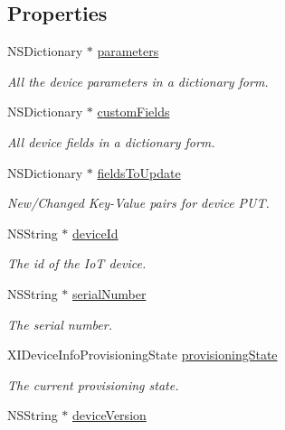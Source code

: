 \subsection*{Properties}
\begin{DoxyCompactItemize}
\item 
N\+S\+Dictionary $\ast$ \hyperlink{class_x_i_device_info_a9ffa8d12d59d023b4e84972d2ab5090b}{parameters}
\begin{DoxyCompactList}\small\item\em All the device parameters in a dictionary form. \end{DoxyCompactList}\item 
N\+S\+Dictionary $\ast$ \hyperlink{class_x_i_device_info_a7f957997e697f1766cd29a57cda05f37}{custom\+Fields}
\begin{DoxyCompactList}\small\item\em All device fields in a dictionary form. \end{DoxyCompactList}\item 
N\+S\+Dictionary $\ast$ \hyperlink{class_x_i_device_info_aaa3e21f185171a65e7976c05209ff3cd}{fields\+To\+Update}
\begin{DoxyCompactList}\small\item\em New/\+Changed Key-\/\+Value pairs for device P\+UT. \end{DoxyCompactList}\item 
N\+S\+String $\ast$ \hyperlink{class_x_i_device_info_aa89ded62978ed5dee588d15b388fd455}{device\+Id}
\begin{DoxyCompactList}\small\item\em The id of the IoT device. \end{DoxyCompactList}\item 
N\+S\+String $\ast$ \hyperlink{class_x_i_device_info_a74d409685fc6546a9272636806985147}{serial\+Number}
\begin{DoxyCompactList}\small\item\em The serial number. \end{DoxyCompactList}\item 
X\+I\+Device\+Info\+Provisioning\+State \hyperlink{class_x_i_device_info_a7ef1e9cac2ea7949086b790b252ce4f2}{provisioning\+State}
\begin{DoxyCompactList}\small\item\em The current provisioning state. \end{DoxyCompactList}\item 
N\+S\+String $\ast$ \hyperlink{class_x_i_device_info_aa4fc691baad98b90f8480c98084242cc}{device\+Version}

\end{DoxyCompactItemize}
